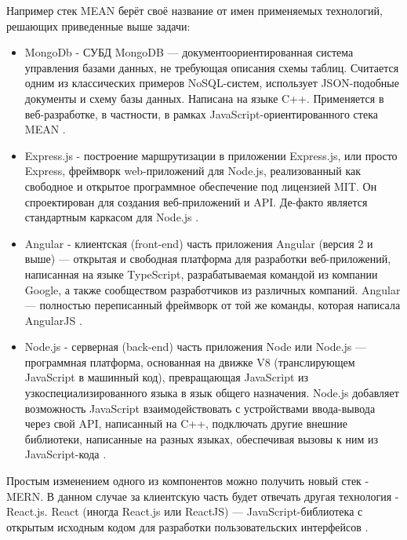     Например стек MEAN берёт своё название от имен применяемых технологий, решающих приведенные выше задачи:
    \begin{itemize}
        \item MongoDb - СУБД
        MongoDB — документоориентированная система управления базами данных, не требующая описания схемы таблиц.
        Считается одним из классических примеров NoSQL-систем, использует JSON-подобные документы и схему базы данных.
        Написана на языке C++.
        Применяется в веб-разработке, в частности, в рамках JavaScript-ориентированного стека MEAN \cite{wiki-MongoDB}.
        
        \item Express.js - построение маршрутизации в приложении
        Express.js, или просто Express, фреймворк web-приложений для Node.js, реализованный как свободное и открытое программное обеспечение под лицензией MIT.
        Он спроектирован для создания веб-приложений и API.
        Де-факто является стандартным каркасом для Node.js \cite{wiki-Express.js}.

        \item Angular - клиентская (front-end) часть приложения
        Angular (версия 2 и выше) — открытая и свободная платформа для разработки веб-приложений, написанная на языке TypeScript, разрабатываемая командой из компании Google, а также сообществом разработчиков из различных компаний.
        Angular — полностью переписанный фреймворк от той же команды, которая написала AngularJS \cite{wiki-angular.js}.

        \item Node.js - серверная (back-end) часть приложения
        Node или Node.js — программная платформа, основанная на движке V8 (транслирующем JavaScript в машинный код), превращающая JavaScript из узкоспециализированного языка в язык общего назначения.
        Node.js добавляет возможность JavaScript взаимодействовать с устройствами ввода-вывода через свой API, написанный на C++, подключать другие внешние библиотеки, написанные на разных языках, обеспечивая вызовы к ним из JavaScript-кода \cite{wiki-nodejs}.
    \end{itemize}
    
    Простым изменением одного из компонентов можно получить новый стек - MERN.
    В данном случае за клиентскую часть будет отвечать другая технология - React.js.
    React (иногда React.js или ReactJS) — JavaScript-библиотека с открытым исходным кодом для разработки пользовательских интерфейсов \cite{wiki-react}.

